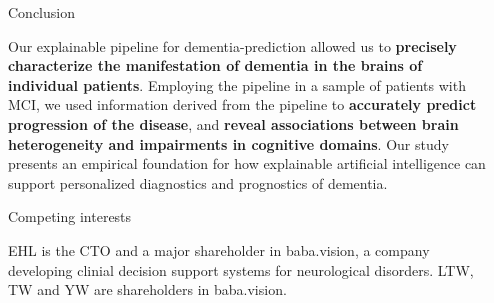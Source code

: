\documentclass[final,11pt]{beamer}
\begin{document}
\begin{frame}[t]
        \begin{columns}[t]
            \begin{column}{.6\textwidth}
                
            \end{column}
            \begin{column}{.3\textwidth}
                \vspace{1cm}
                \begin{block}{Conclusion}
                    \parbox{\textwidth}{\justify
Our explainable pipeline for dementia-prediction allowed us to \textbf{precisely characterize the manifestation of dementia in the brains of individual patients}. Employing the pipeline in a sample of patients with MCI, we used information derived from the pipeline to \textbf{accurately predict progression of the disease}, and \textbf{reveal associations between brain heterogeneity and impairments in cognitive domains}. Our study presents an empirical foundation for how explainable artificial intelligence can support personalized diagnostics and prognostics of dementia.
                    }
                \end{block}
                \begin{block}{Competing interests}
                    \parbox{\textwidth}{\justify
EHL is the CTO and a major shareholder in baba.vision, a company developing clinial decision support systems for neurological disorders. LTW, TW and YW are shareholders in baba.vision.
                    }
                \end{block}
            \end{column}
        \end{columns}

        \vspace{0.5cm}


\end{frame}
\end{document}
